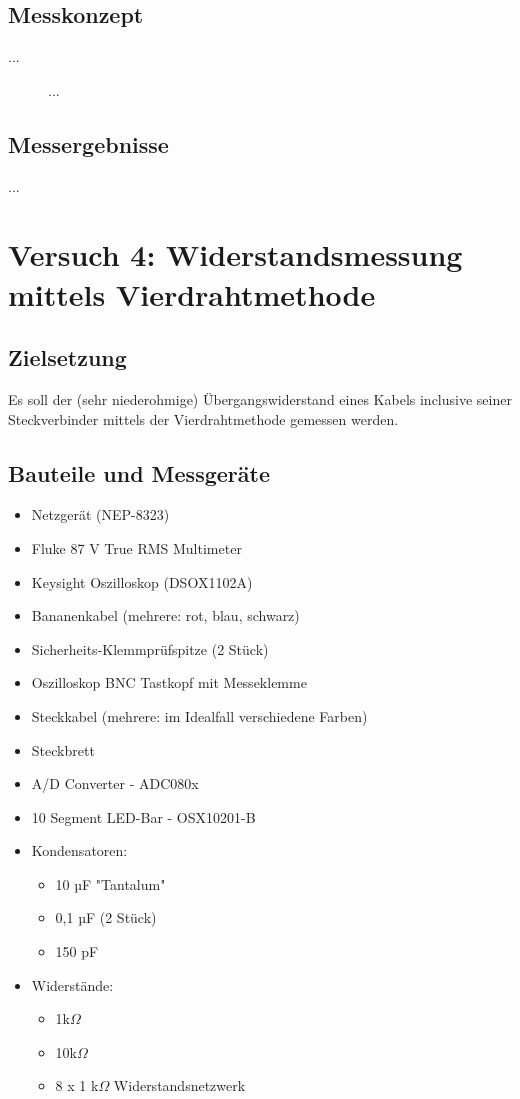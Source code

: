 \documentclass[a4paper,12pt]{article}
\begin{document}
\subsection{Messkonzept}
...

\begin{figure}[H]
    \centering
\caption{...}
\end{figure}


\subsection{Messergebnisse}
...

\section{Versuch 4: Widerstandsmessung mittels Vierdrahtmethode}
\subsection{Zielsetzung}
Es soll der (sehr niederohmige) Übergangswiderstand eines Kabels inclusive seiner Steckverbinder
mittels der Vierdrahtmethode gemessen werden.

\subsection{Bauteile und Messgeräte}
\begin{itemize}
\item Netzgerät (NEP-8323)
\item Fluke 87 V True RMS Multimeter
\item Keysight Oszilloskop (DSOX1102A)
\item Bananenkabel (mehrere: rot, blau, schwarz)
\item Sicherheits-Klemmprüfspitze (2 Stück)
\item Oszilloskop BNC Tastkopf mit Messeklemme
\item Steckkabel (mehrere: im Idealfall verschiedene Farben)
\item Steckbrett\\
\end{itemize}


\begin{itemize}
\item A/D Converter - ADC080x
\item 10 Segment LED-Bar - OSX10201-B
\newpage
\item Kondensatoren: 
	\begin{itemize}
	\item 10 µF "Tantalum"
	\item 0,1 µF (2 Stück)
	\item 150 pF
	\end{itemize}
\item Widerstände: 
	\begin{itemize}
	\item 1k$\Omega$
	\item 10k$\Omega$
	\item 8 x 1 k$\Omega$ Widerstandsnetzwerk
	\end{itemize}
\end{itemize}
\end{document}
